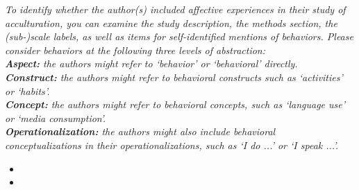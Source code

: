 \documentclass[10pt,a4paper]{protocol}
\begin{document}

\textit{To identify whether the author(s) included affective experiences in their study of acculturation, you can examine the study description, the methods section, the (sub-)scale labels, as well as items for self-identified mentions of behaviors. Please consider behaviors at the following three levels of abstraction:\\
\textbf{Aspect:} the authors might refer to `behavior' or `behavioral' directly.\\
\textbf{Construct:} the authors might refer to behavioral constructs such as `activities' or `habits'.\\
\textbf{Concept:} the authors might refer to behavioral concepts, such as `language use' or `media consumption'.\\
\textbf{Operationalization:} the authors might also include behavioral conceptualizations in their operationalizations, such as `I do ...' or `I speak ...'.}
\vspace{0.5em}
\begin{itemize}
	\item {}
	\item {}
\end{itemize}
\divider


\clearpage
\vspace*{2em}

\end{document}
